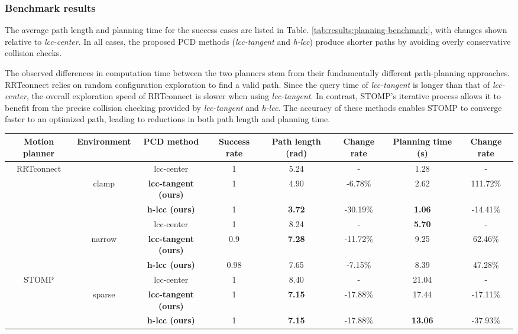 \documentclass[conference]{IEEEtran}
\begin{document}
\subsubsection{Benchmark results} The average path length and planning time for the success cases are listed in Table. \ref{tab:results:planning-benchmark}, with changes shown relative to \textit{lcc-center}. In all cases, the proposed PCD methods (\textit{lcc-tangent} and \textit{h-lcc}) produce shorter paths by avoiding overly conservative collision checks.

The observed differences in computation time between the two planners stem from their fundamentally different path-planning approaches. RRTconnect relies on random configuration exploration to find a valid path. Since the query time of \textit{lcc-tangent} is longer than that of \textit{lcc-center}, the overall exploration speed of RRTconnect is slower when using \textit{lcc-tangent}. In contrast, STOMP's iterative process allows it to benefit from the precise collision checking provided by \textit{lcc-tangent} and \textit{h-lcc}. The accuracy of these methods enables STOMP to converge faster to an optimized path, leading to reductions in both path length and planning time. 



\begin{table*}[tb]
\centering
\caption{Planning benchmark results. The change rate is relative to the result of the baseline PCD method. }
\label{tab:results:planning-benchmark}
\begin{tabular}{c|c|c|ccccc}
\hline
Motion planner & Environment & PCD method & Success rate & Path length (rad) & Change rate & Planning time (s) & Change rate \\ \hline
\multirow{6}{*}{RRTconnect} &  & lcc-center & 1 & 5.24 & - & 1.28 & - \\
 & clamp & \textbf{lcc-tangent (ours)} & 1 & 4.90 & -6.78\% & 2.62 & 111.72\% \\
 &  & \textbf{h-lcc (ours)} & 1 & \textbf{3.72} & -30.19\% & \textbf{1.06} & -14.41\% \\ \cline{2-8} 
 &  & lcc-center & 1 & 8.24 & - &\textbf{ 5.70} & - \\
 & narrow & \textbf{lcc-tangent (ours)} & 0.9 & \textbf{7.28} & -11.72\% & 9.25 & 62.46\% \\
 &  & \textbf{h-lcc (ours)}& 0.98 & 7.65 & -7.15\% & 8.39 & 47.28\% \\ \hline
\multirow{3}{*}{STOMP} &  & lcc-center & 1 & 8.40 & - & 21.04 & - \\
 & sparse & \textbf{lcc-tangent (ours)} & 1 & \textbf{7.15} & -17.88\% & 17.44 & -17.11\% \\
 &  & \textbf{h-lcc (ours)} & 1 & \textbf{7.15} & -17.88\% & \textbf{13.06} & -37.93\% \\ \hline
\end{tabular}
\end{table*}
\end{document}
